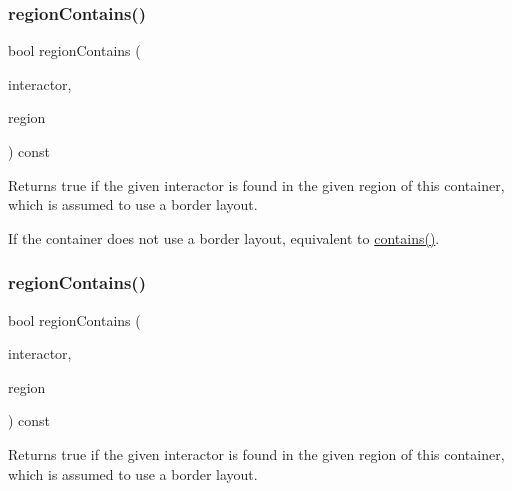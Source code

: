 \subsubsection{\texorpdfstring{region\+Contains()}{regionContains()}\hspace{0.1cm}{\footnotesize\ttfamily [3/4]}}
{\footnotesize\ttfamily bool region\+Contains (\begin{DoxyParamCaption}\item[{\mbox{\hyperlink{classsgl_1_1GInteractor}{G\+Interactor}} \&}]{interactor,  }\item[{\mbox{\hyperlink{classsgl_1_1GContainer_a81a01a86de31071a92e6cce0bab9bc4b}{G\+Container\+::\+Region}}}]{region }\end{DoxyParamCaption}) const\hspace{0.3cm}{\ttfamily [virtual]}}



Returns true if the given interactor is found in the given region of this container, which is assumed to use a border layout. 

If the container does not use a border layout, equivalent to \mbox{\hyperlink{classsgl_1_1GContainer_a29e67f98cd36414c67475b8941d861a6}{contains()}}. \mbox{\label{classsgl_1_1GContainer_ad67deacd62d3248fbe57ccbd4e96fb50}} 
\subsubsection{\texorpdfstring{region\+Contains()}{regionContains()}\hspace{0.1cm}{\footnotesize\ttfamily [4/4]}}
{\footnotesize\ttfamily bool region\+Contains (\begin{DoxyParamCaption}\item[{\mbox{\hyperlink{classsgl_1_1GInteractor}{G\+Interactor}} \&}]{interactor,  }\item[{const std\+::string \&}]{region }\end{DoxyParamCaption}) const\hspace{0.3cm}{\ttfamily [virtual]}}



Returns true if the given interactor is found in the given region of this container, which is assumed to use a border layout. 

